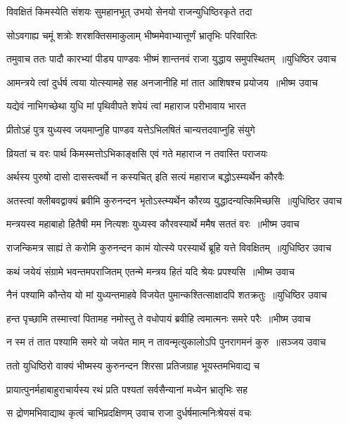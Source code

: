 \twolineshloka
{विवक्षितं किमस्येति संशयः सुमहानभूत्}
{उभयो सेनयो राजन्युधिष्ठिरकृते तदा}


\twolineshloka
{सोऽवगाह्य चमूं शत्रोः शरशक्तिसमाकुलाम्}
{भीष्ममेवाभ्यात्तूर्णं भ्रातृभिः परिवारितः}


\threelineshloka
{तमुवाच ततः पादौ कारभ्यां पीड्य पाण्डवः}
{भीष्मं शान्तनवं राजा युद्धाय समुपस्थितम् ॥युधिष्ठिर उवाच}
{}


\threelineshloka
{आमन्त्रये त्वां दुर्धर्ष त्वया योत्स्यामहे सह}
{अनजानीहि मां तात आशिषश्च प्रयोजय ॥भीष्म उवाच}
{}


\twolineshloka
{यद्येवं नाभिगच्छेथा युधि मां पृथिवीपते}
{शपेयं त्वां महाराज परीभावाय भारत}


\twolineshloka
{प्रीतोऽहं पुत्र युध्यस्व जयमाप्नुहि पाण्डव}
{यत्तेऽभिलषितं चान्यत्तदवाप्नुहि संयुगे}


\twolineshloka
{व्रियतां च वरः पार्थ किमस्मत्तोऽभिकाङ्क्षसि}
{एवं गते महाराज न तवास्ति पराजयः}


\twolineshloka
{अर्थस्य पुरुषो दासो दासस्त्वर्थो न कस्यचित्}
{इति सत्यं महाराज बद्धोऽस्म्यर्थेन कौरवैः}


\threelineshloka
{अतस्त्वां क्लीबवद्वाक्यं ब्रवीमि कुरुनन्दन}
{भृतोऽस्त्म्यर्थेन कौरव्य युद्धादन्यत्किमिच्छसि ॥युधिष्ठिर उवाच}
{}


\threelineshloka
{मन्त्रयस्व महाबाहो हितैषी मम नित्यशः}
{युध्यस्व कौरवस्यार्थे ममैष सततं वरः ॥भीष्म उवाच}
{}


\threelineshloka
{राजन्किमत्र साह्यं ते करोमि कुरुनन्दन}
{कामं योत्स्ये परस्यार्थे ब्रूहि यत्ते विवक्षितम् ॥युधिष्ठिर उवाच}
{}


\threelineshloka
{कथं जयेयं संग्रामे भवन्तमपराजितम्}
{एतन्मे मन्त्रय हितं यदि श्रेयः प्रपश्यसि ॥भीष्म उवाच}
{}


\threelineshloka
{नैनं पश्यामि कौन्तेय यो मां युध्यन्तमाहवे}
{विजयेत पुमान्कश्तित्साक्षादपि शतक्रतुः ॥युधिष्ठिर उवाच}
{}


\threelineshloka
{हन्त पृच्छामि तस्मात्त्वां पितामह नमोस्तु ते}
{वधोपायं ब्रवीहि त्वमात्मनः समरे परैः ॥भीष्म उवाच}
{}


\threelineshloka
{न स्म तं तात पश्यामि समरे यो जयेत माम्}
{न तावन्मृत्युकालोऽपि पुनरागमनं कुरु ॥सञ्जय उवाच}
{}


\twolineshloka
{ततो युधिष्ठिरो वाक्यं भीष्मस्य कुरुनन्दन}
{शिरसा प्रतिजग्राह भूयस्तमभिवाद्य च}


\twolineshloka
{प्रायात्पुनर्महाबाहुराचार्यस्य रथं प्रति}
{पश्यतां सर्वसैन्यानां मध्येन भ्रातृभिः सह}


\twolineshloka
{स द्रोणमभिवाद्याथ कृत्वं चाभिप्रदक्षिणम्}
{उवाच राजा दुर्धर्षमात्मनिःश्रेयसं वचः}


